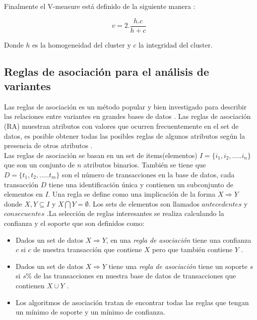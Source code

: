 {Finalmente el V-measure está definido de la siguiente manera \cite{Rosenberg2007}:

$$v= 2.\frac{h.c}{h+c}$$

Donde $h$ es la homogeneidad del cluster  y $c$ la integridad del cluster. 

\subsection{Reglas de asociación para el análisis de variantes}

Las reglas de asociación es un método popular y bien investigado para describir las relaciones entre variantes en grandes bases de datos \cite{Hahsler2005}. Las reglas de asociación (RA) muestran atributos con valores que ocurren frecuentemente en el set de datos, es posible obtener todas las posibles reglas de algunos atributos según la presencia de otros atributos \cite{Karabatak2009}.\\

Las reglas de asociación se basan en un set de items(elementos) $I = \{i_1,i_2,.....i_n \}$ que son un conjunto de $n$ atributos binarios. También se tiene que $D = \{t_1,t_2,..... t_m\}$ son el número de transacciones en la base de datos, cada transacción $D$ tiene una identificación única y contienen un subconjunto de elementos en $I$. Una regla se define como una implicación de la forma $X \Rightarrow Y$ donde $X,Y \subseteq I$ y $X \bigcap Y = \emptyset$. Los sets de elementos son llamados $antecedentes$ y $consecuentes$ \cite{Hahsler2005,Karabatak2009}.La selección de reglas interesantes se realiza calculando la confianza y el soporte que son definidos como:

\begin{itemize}
	\item Dados un set de datos $X \Rightarrow Y$, en una \textit{regla de asociación} tiene una confianza $c$ si $c$ de nuestra transacción que contiene $X$ pero que también contiene $Y$ \cite{Agrawal1994}.
	
	\item Dados un set de datos $X \Rightarrow Y$ tiene una \textit{regla de asociación} tiene un soporte $s$ si $s\%$ de las transacciones en nuestra base de datos de transacciones que contienen $X\cup Y$ \cite{Agrawal1994}. 
	
	\item Los algoritmos de asociación tratan de encontrar todas las reglas que tengan un mínimo de soporte y un mínimo de confianza\cite{Agrawal1994}. 
	

\end{itemize}}
